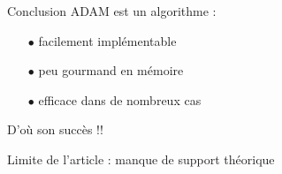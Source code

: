 \documentclass[11pt,aspectratio=169,xcolor=dvipsnames, french]{beamer}
\begin{document}
\begin{frame}{Conclusion}
ADAM est un algorithme :  

\begin{itemize}
\item[$\bullet$] facilement implémentable 
\item[$\bullet$] peu gourmand en mémoire
\item[$\bullet$] efficace dans de nombreux cas
\end{itemize}

D'où son succès !! 

Limite de l'article : manque de support théorique

\end{frame}
\end{document}
